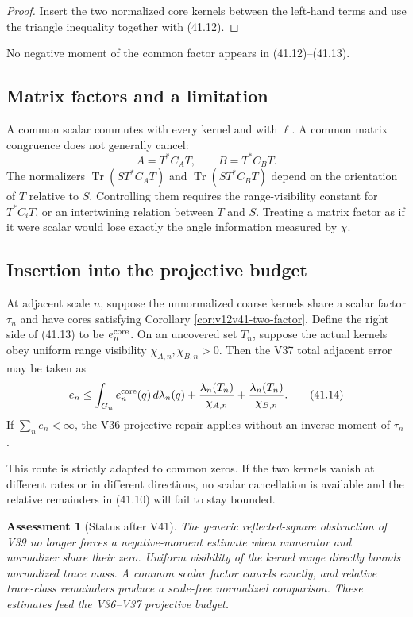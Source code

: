 \documentclass[11pt]{article}
\newtheorem{assessment}[theorem]{Assessment}
\theoremstyle{remark}
\begin{document}
\begin{proof}
Insert the two normalized core kernels between the left-hand terms
and use the triangle inequality together with (41.12).
\end{proof}

No negative moment of the common factor appears in (41.12)--(41.13).

\subsection{Matrix factors and a limitation}

A common scalar commutes with every kernel and with \(\ell\).
A common matrix congruence does not generally cancel:
\[
 A=T^*C_AT,\qquad B=T^*C_BT.
\]
The normalizers
\(\operatorname{Tr}(ST^*C_AT)\) and
\(\operatorname{Tr}(ST^*C_BT)\) depend on the orientation of \(T\)
relative to \(S\).  Controlling them requires the range-visibility
constant for \(T^*C_iT\), or an intertwining relation between \(T\)
and \(S\).  Treating a matrix factor as if it were scalar would lose
exactly the angle information measured by \(\chi\).

\subsection{Insertion into the projective budget}

At adjacent scale \(n\), suppose the unnormalized coarse kernels
share a scalar factor \(\tau_n\) and have cores satisfying
Corollary \ref{cor:v12v41-two-factor}.  Define the right side of
(41.13) to be \(e_n^{\rm core}\).  On an uncovered set \(T_n\),
suppose the actual kernels obey uniform range visibility
\(\chi_{A,n},\chi_{B,n}>0\).  Then the V37 total adjacent error may
be taken as
\begin{equation}
 e_n
 \leq
 \int_{G_n}e_n^{\rm core}(q)\,d\lambda_n(q)
 +
 {\lambda_n(T_n)\over\chi_{A,n}}
 +
 {\lambda_n(T_n)\over\chi_{B,n}}.                \tag{41.14}
\end{equation}
If \(\sum_ne_n<\infty\), the V36 projective repair applies without
an inverse moment of \(\tau_n\).

This route is strictly adapted to common zeros.  If the two kernels
vanish at different rates or in different directions, no scalar
cancellation is available and the relative remainders in (41.10)
will fail to stay bounded.

\begin{assessment}[Status after V41]
\label{ass:v12v41-status}
The generic reflected-square obstruction of V39 no longer forces a
negative-moment estimate when numerator and normalizer share their
zero.  Uniform visibility of the kernel range directly bounds
normalized trace mass.  A common scalar factor cancels exactly, and
relative trace-class remainders produce a scale-free normalized
comparison.  These estimates feed the V36--V37 projective budget.
\end{assessment}
\end{document}
